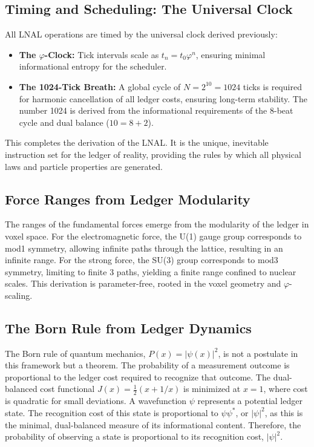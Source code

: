 \documentclass[11pt,a4paper]{article}
\begin{document}
\subsection{Timing and Scheduling: The Universal Clock}
All LNAL operations are timed by the universal clock derived previously:
\begin{itemize}
    \item \textbf{The \(\varphi\)-Clock:} Tick intervals scale as \(t_n = t_0 \varphi^n\), ensuring minimal informational entropy for the scheduler.
    \item \textbf{The 1024-Tick Breath:} A global cycle of \(N=2^{10}=1024\) ticks is required for harmonic cancellation of all ledger costs, ensuring long-term stability. The number 1024 is derived from the informational requirements of the 8-beat cycle and dual balance (\(10=8+2\)).
\end{itemize}
This completes the derivation of the LNAL. It is the unique, inevitable instruction set for the ledger of reality, providing the rules by which all physical laws and particle properties are generated.

\subsection{Force Ranges from Ledger Modularity}
The ranges of the fundamental forces emerge from the modularity of the ledger in voxel space. For the electromagnetic force, the U(1) gauge group corresponds to mod1 symmetry, allowing infinite paths through the lattice, resulting in an infinite range. For the strong force, the SU(3) group corresponds to mod3 symmetry, limiting to finite 3 paths, yielding a finite range confined to nuclear scales. This derivation is parameter-free, rooted in the voxel geometry and \(\varphi\)-scaling.

\subsection{The Born Rule from Ledger Dynamics}
The Born rule of quantum mechanics, \(P(x) = |\psi(x)|^2\), is not a postulate in this framework but a theorem. The probability of a measurement outcome is proportional to the ledger cost required to recognize that outcome. The dual-balanced cost functional \(J(x) = \frac{1}{2}(x+1/x)\) is minimized at \(x=1\), where cost is quadratic for small deviations. A wavefunction \(\psi\) represents a potential ledger state. The recognition cost of this state is proportional to \(\psi \psi^*\), or \(|\psi|^2\), as this is the minimal, dual-balanced measure of its informational content. Therefore, the probability of observing a state is proportional to its recognition cost, \(|\psi|^2\).
\end{document}
